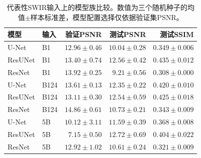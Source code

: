 \begin{table}[htbp]
\centering
\caption{代表性SWIR输入上的模型族比较。数值为三个随机种子的均值$\pm$样本标准差，模型配置选择仅依据验证集PSNR。}
\label{tab:model-results-zh}
\small
\begin{tabular}{llrrr}
\toprule
模型 & 输入 & 验证PSNR & 测试PSNR & 测试SSIM \\
\midrule
U-Net & B1 & $12.96\pm0.46$ & $10.04\pm0.28$ & $0.349\pm0.006$ \\
ResUNet & B1 & $13.40\pm0.74$ & $12.56\pm0.42$ & $0.435\pm0.012$ \\
ResNet & B1 & $13.92\pm0.25$ & $9.21\pm0.56$ & $0.308\pm0.000$ \\
U-Net & B124 & $13.61\pm0.13$ & $12.35\pm0.22$ & $0.420\pm0.010$ \\
ResUNet & B124 & $13.11\pm0.30$ & $12.54\pm0.59$ & $0.425\pm0.018$ \\
ResNet & B124 & $14.86\pm0.61$ & $10.73\pm0.21$ & $0.343\pm0.009$ \\
U-Net & 5B & $10.12\pm3.11$ & $11.59\pm0.39$ & $0.368\pm0.008$ \\
ResUNet & 5B & $7.15\pm0.50$ & $12.72\pm0.69$ & $0.404\pm0.022$ \\
ResNet & 5B & $12.92\pm1.02$ & $10.61\pm0.24$ & $0.321\pm0.009$ \\
\bottomrule
\end{tabular}
\end{table}
